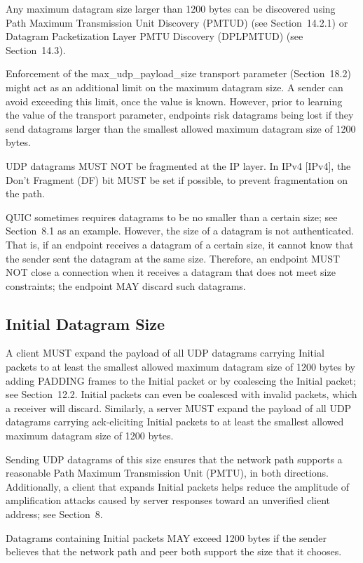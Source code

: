 \documentclass{article}
\begin{document}
Any maximum datagram size larger than 1200 bytes can be discovered using Path Maximum Transmission Unit Discovery (PMTUD) (see Section~14.2.1) or Datagram Packetization Layer PMTU Discovery (DPLPMTUD) (see Section~14.3).

Enforcement of the max\_udp\_payload\_size transport parameter (Section~18.2) might act as an additional limit on the maximum datagram size.  A sender can avoid exceeding this limit, once the value is known.  However, prior to learning the value of the transport parameter, endpoints risk datagrams being lost if they send datagrams larger than the smallest allowed maximum datagram size of 1200 bytes.

UDP datagrams MUST NOT be fragmented at the IP layer.  In IPv4 [IPv4], the Don't Fragment (DF) bit MUST be set if possible, to prevent fragmentation on the path.

QUIC sometimes requires datagrams to be no smaller than a certain size; see Section~8.1 as an example.  However, the size of a datagram is not authenticated.  That is, if an endpoint receives a datagram of a certain size, it cannot know that the sender sent the datagram at the same size.  Therefore, an endpoint MUST NOT close a connection when it receives a datagram that does not meet size constraints; the endpoint MAY discard such datagrams.

\subsection{Initial Datagram Size}

A client MUST expand the payload of all UDP datagrams carrying Initial packets to at least the smallest allowed maximum datagram size of 1200 bytes by adding PADDING frames to the Initial packet or by coalescing the Initial packet; see Section~12.2.  Initial packets can even be coalesced with invalid packets, which a receiver will discard.  Similarly, a server MUST expand the payload of all UDP datagrams carrying ack-eliciting Initial packets to at least the smallest allowed maximum datagram size of 1200 bytes.

Sending UDP datagrams of this size ensures that the network path supports a reasonable Path Maximum Transmission Unit (PMTU), in both directions.  Additionally, a client that expands Initial packets helps reduce the amplitude of amplification attacks caused by server responses toward an unverified client address; see Section~8.

Datagrams containing Initial packets MAY exceed 1200 bytes if the sender believes that the network path and peer both support the size that it chooses.
\end{document}
